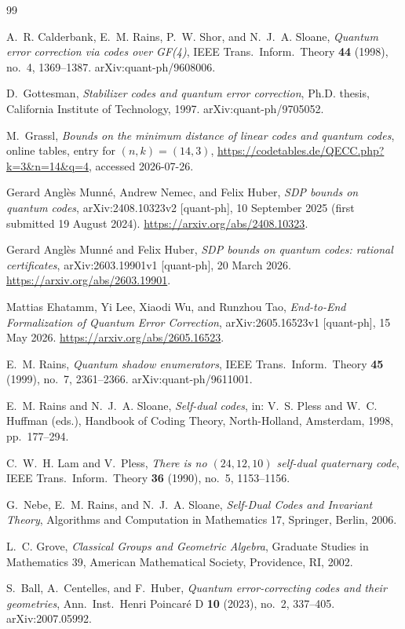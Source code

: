 \documentclass[11pt]{amsart}
\theoremstyle{definition}
\theoremstyle{remark}
\begin{document}
\begin{thebibliography}{99}

A.~R. Calderbank, E.~M. Rains, P.~W. Shor, and N.~J.~A. Sloane,
\emph{Quantum error correction via codes over GF(4)},
IEEE Trans.\ Inform.\ Theory \textbf{44} (1998), no.~4, 1369--1387.
arXiv:quant-ph/9608006.

D.~Gottesman,
\emph{Stabilizer codes and quantum error correction},
Ph.D. thesis, California Institute of Technology, 1997.
arXiv:quant-ph/9705052.

M.~Grassl,
\emph{Bounds on the minimum distance of linear codes and quantum codes},
online tables, entry for $(n,k)=(14,3)$,
\url{https://codetables.de/QECC.php?k=3&n=14&q=4}, accessed 2026-07-26.

Gerard Angl\`es Munn\'e, Andrew Nemec, and Felix Huber,
\emph{SDP bounds on quantum codes},
arXiv:2408.10323v2 [quant-ph], 10 September 2025
(first submitted 19 August 2024).
\url{https://arxiv.org/abs/2408.10323}.

Gerard Angl\`es Munn\'e and Felix Huber,
\emph{SDP bounds on quantum codes: rational certificates},
arXiv:2603.19901v1 [quant-ph], 20 March 2026.
\url{https://arxiv.org/abs/2603.19901}.

Mattias Ehatamm, Yi Lee, Xiaodi Wu, and Runzhou Tao,
\emph{End-to-End Formalization of Quantum Error Correction},
arXiv:2605.16523v1 [quant-ph], 15 May 2026.
\url{https://arxiv.org/abs/2605.16523}.

E.~M. Rains,
\emph{Quantum shadow enumerators},
IEEE Trans.\ Inform.\ Theory \textbf{45} (1999), no.~7, 2361--2366.
arXiv:quant-ph/9611001.

E.~M. Rains and N.~J.~A. Sloane,
\emph{Self-dual codes},
in: V.~S. Pless and W.~C. Huffman (eds.), Handbook of Coding Theory,
North-Holland, Amsterdam, 1998, pp.~177--294.

C.~W.~H. Lam and V.~Pless,
\emph{There is no $(24,12,10)$ self-dual quaternary code},
IEEE Trans.\ Inform.\ Theory \textbf{36} (1990), no.~5, 1153--1156.

G.~Nebe, E.~M. Rains, and N.~J.~A. Sloane,
\emph{Self-Dual Codes and Invariant Theory},
Algorithms and Computation in Mathematics 17, Springer, Berlin, 2006.

L.~C. Grove,
\emph{Classical Groups and Geometric Algebra},
Graduate Studies in Mathematics 39, American Mathematical Society,
Providence, RI, 2002.

S.~Ball, A.~Centelles, and F.~Huber,
\emph{Quantum error-correcting codes and their geometries},
Ann.\ Inst.\ Henri Poincar\'e D \textbf{10} (2023), no.~2, 337--405.
arXiv:2007.05992.

\end{thebibliography}
\end{document}

